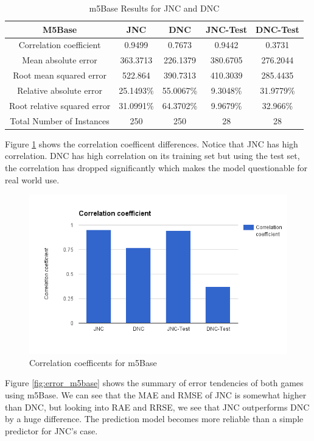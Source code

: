 \begin{table}[h]
\centering
\caption{m5Base Results for JNC and DNC}
\label{table:m5base_results}
\begin{tabular}{|c|c|c|c|c|}
\hline 
M5Base & JNC & DNC & JNC-Test & DNC-Test \\ 
\hline 
Correlation coefficient & 0.9499 & 0.7673 & 0.9442 & 0.3731
\\Mean absolute error & 363.3713 & 226.1379 & 380.6705 & 276.2044
\\Root mean squared error & 522.864 &  390.7313 & 410.3039 & 285.4435
\\Relative absolute error & 25.1493\% & 55.0067\% & 9.3048\% & 31.9779\%
\\Root relative squared error  & 31.0991\% & 64.3702\% & 9.9679\% & 32.966\% 
\\Total Number of Instances & 250 & 250 & 28 & 28
\\
\hline 
\end{tabular}
\end{table} 

Figure \ref{fig:correl_m5base} shows the correlation coefficent differences. Notice that JNC has high correlation. DNC has high correlation on its training set but using the test set, the correlation has dropped significantly which makes the model questionable for real world use.

\begin{figure}[h!]
\centering
\includegraphics[scale=0.4]{figures/m5Base_1.png} 
\caption{Correlation coefficents for m5Base}
\label{fig:correl_m5base}
\end{figure}

Figure \ref{fig:error_m5base} shows the summary of error tendencies of both games using m5Base. We can see that the MAE and RMSE of JNC is somewhat higher than DNC, but looking into RAE and RRSE, we see that JNC outperforms DNC by a huge difference. The prediction model becomes more reliable than a simple predictor for JNC's case.

